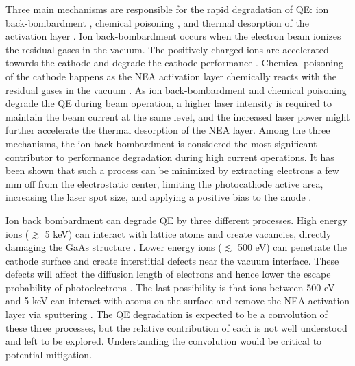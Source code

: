 Three main mechanisms are responsible for the rapid degradation of QE: ion back-bombardment \cite{grames2011_ChargeFluenceLifetime,cultrera2011_PhotocathodeBehaviorHigh,liu2016_EffectsIonBombardmenta}, chemical poisoning \cite{chanlek2014_DegradationQuantumEfficiency}, and thermal desorption of the activation layer \cite{kuriki2011_DarklifetimeDegradationGaAs}.
Ion back-bombardment occurs when the electron beam ionizes the residual gases in the vacuum. The positively charged ions are accelerated towards the cathode and degrade the cathode performance \cite{grames2011_ChargeFluenceLifetime,cultrera2011_PhotocathodeBehaviorHigh}.
Chemical poisoning of the cathode happens as the NEA activation layer chemically reacts with the residual gases in the vacuum \cite{chanlek2014_DegradationQuantumEfficiency}.
As ion back-bombardment and chemical poisoning degrade the QE during beam operation, a higher laser intensity is required to maintain the beam current at the same level, and the increased laser power might further accelerate the thermal desorption of the NEA layer.
Among the three mechanisms, the ion back-bombardment is considered the most significant contributor to performance degradation during high current operations. It has been shown that such a process can be minimized by extracting electrons a few mm off from the electrostatic center, limiting the photocathode active area, increasing the laser spot size, and applying a positive bias to the anode \cite{grames2011_ChargeFluenceLifetime,yoskowitz2021_IMPROVINGOPERATIONALLIFETIME}.

Ion back bombardment can degrade QE by three different processes.
High energy ions ($\gtrsim$ 5 keV) can interact with lattice atoms and create vacancies, directly damaging the GaAs structure \cite{biswas2019_StudyPhotocathodeSurfacea,liu2016_EffectsIonBombardmenta}.
Lower energy ions ($\lesssim$ 500 eV) can penetrate the cathode surface and create interstitial defects near the vacuum interface. These defects will affect the diffusion length of electrons and hence lower the escape probability of photoelectrons \cite{liu2016_EffectsIonBombardmenta}.
The last possibility is that ions between 500 eV and 5 keV can interact with atoms on the surface and remove the NEA activation layer via sputtering \cite{biswas2019_StudyPhotocathodeSurfacea}.
The QE degradation is expected to be a convolution of these three processes, but the relative contribution of each is not well understood and left to be explored.
Understanding the convolution would be critical to potential mitigation.

